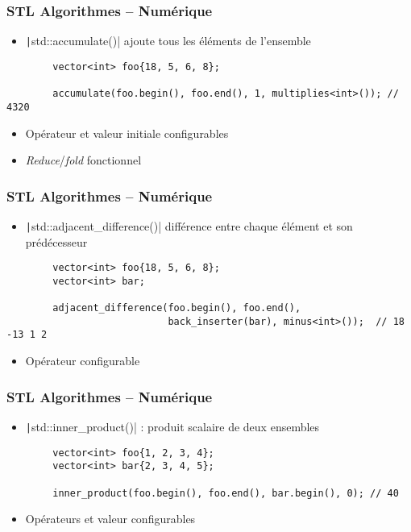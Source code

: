 \documentclass[C++.tex]{subfiles}
\begin{document}
\begin{frame}[fragile]
	\frametitle{STL Algorithmes -- Numérique}
	\begin{itemize}
		\item \texttt|std::accumulate()| \og ajoute\fg{} tous les éléments de l'ensemble
	\end{itemize}

	\begin{verbatim}
		vector<int> foo{18, 5, 6, 8};

		accumulate(foo.begin(), foo.end(), 1, multiplies<int>()); // 4320
	\end{verbatim}

	\begin{itemize}
		\item Opérateur et valeur initiale configurables
		\item \textit{Reduce}/\textit{fold} fonctionnel
	\end{itemize}
\end{frame}

\begin{frame}[fragile]
	\frametitle{STL Algorithmes -- Numérique}
	\begin{itemize}
		\item \texttt|std::adjacent_difference()| \og différence\fg{} entre chaque élément et son prédécesseur
	\end{itemize}

	\begin{verbatim}
		vector<int> foo{18, 5, 6, 8};
		vector<int> bar;

		adjacent_difference(foo.begin(), foo.end(), 
		                    back_inserter(bar), minus<int>());  // 18 -13 1 2
	\end{verbatim}

	\begin{itemize}
		\item Opérateur configurable
	\end{itemize}
\end{frame}

\begin{frame}[fragile]
	\frametitle{STL Algorithmes -- Numérique}
	\begin{itemize}
		\item \texttt|std::inner_product()| : \og produit scalaire\fg{} de deux ensembles
	\end{itemize}

	\begin{verbatim}
		vector<int> foo{1, 2, 3, 4};
		vector<int> bar{2, 3, 4, 5};

		inner_product(foo.begin(), foo.end(), bar.begin(), 0); // 40
	\end{verbatim}

	\begin{itemize}
		\item Opérateurs et valeur configurables
	\end{itemize}
\end{frame}
\end{document}
